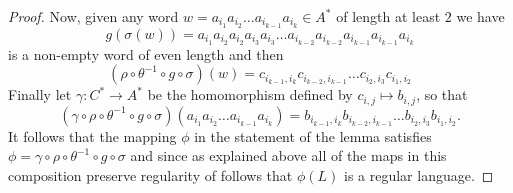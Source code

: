 \documentclass[10pt,a4paper]{amsart}
\begin{document}
\begin{proof}
Now, given any word 
$w = a_{i_1} a_{i_2} \ldots a_{i_{k-1}} a_{i_k}\in A^*$ of length at least $2$ we have 
\[
g(\sigma(w)) = 
a_{i_1} 
a_{i_2} 
a_{i_2} 
a_{i_3} 
a_{i_3} 
\ldots
a_{i_{k-2}} 
a_{i_{k-2}} 
a_{i_{k-1}} 
a_{i_{k-1}} 
a_{i_k}
\]
is a non-empty word of even length and then 
\[
(\rho \circ \theta^{-1} \circ g \circ \sigma)(w) = 
c_{i_{k-1},i_k} 
c_{i_{k-2},i_{k-1}} 
\ldots 
c_{i_2,i_3} 
c_{i_1,i_2} 
\] 
Finally let $\gamma:C^* \rightarrow A^*$ be the homomorphism defined by $c_{i,j} \mapsto b_{i,j}$, so that  
\[
(\gamma \circ \rho \circ \theta^{-1} \circ g \circ \sigma) (a_{i_1} a_{i_2} \ldots a_{i_{k-1}} a_{i_k}) = 
b_{i_{k-1},i_k} 
b_{i_{k-2},i_{k-1}} 
\ldots 
b_{i_2,i_3} 
b_{i_1,i_2}.  
\]
It follows that the mapping $\phi$ in the statement of the lemma satisfies  
$\phi = \gamma \circ \rho \circ \theta^{-1} \circ g \circ \sigma$ and  
since as explained above all of the maps in this composition preserve regularity of follows that $\phi(L)$ is a regular language.    
  \end{proof}
\end{document}
